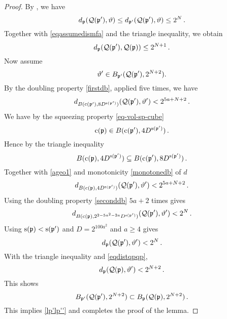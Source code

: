 \begin{proof}
\leanok
By , we have
\begin{equation}
     d_{{\mathfrak p}}({\mathcal{Q}}({\mathfrak p}'),{\vartheta})
     \le d_{{\mathfrak p}'}({\mathcal{Q}}({\mathfrak p}'),{\vartheta})
     \le 2^{N} \, .
\end{equation}
Together with \eqref{eqassumedismfa} and the triangle inequality, we obtain
\begin{equation}\label{eqdistqpqp}
    d_{{\mathfrak p}}({\mathcal{Q}}({\mathfrak p}'),{\mathcal{Q}}({\mathfrak p}))\le 2^{N+1} \, .
\end{equation}
Now assume
\begin{equation}
    {\vartheta}'\in B_{{\mathfrak p}'}({\mathcal{Q}}({\mathfrak p}'),2^{N+2}).
\end{equation}
By the doubling property \eqref{firstdb}, applied five times, we have
\begin{equation}\label{ageo1} d_{B({\mathrm{c}}({\mathfrak p}'),8D^{{\mathrm{s}}({\mathfrak p}')})}({\mathcal{Q}}({\mathfrak p}'),{\vartheta}') < 2^{5a+N+2}\, .
\end{equation}
We have by the squeezing property \eqref{eq-vol-sp-cube}
\begin{equation}
 {\mathrm{c}}({\mathfrak p})\in
B({\mathrm{c}}({\mathfrak p}'),4D^{{\mathrm{s}}({\mathfrak p}')})\, .
\end{equation}
Hence by the triangle inequality
\begin{equation}
 B({\mathrm{c}}({\mathfrak p}), 4D^{{\mathrm{s}}({\mathfrak p}')})
 \subseteq
B({\mathrm{c}}({\mathfrak p}'),8D^{{\mathrm{s}}({\mathfrak p}')})\, .
\end{equation}
Together with \eqref{ageo1} and monotonicity \eqref{monotonedb} of $d$
\begin{equation}
    d_{B({\mathrm{c}}({\mathfrak p}),4D^{{\mathrm{s}}({\mathfrak p}')})}({\mathcal{Q}}({\mathfrak p}'),{\vartheta}') < 2^{5a+N+2}\, .
\end{equation}
Using the doubling property \eqref{seconddb} $5a+2$ times gives
\begin{equation}
    d_{B({\mathrm{c}}({\mathfrak p}),2^{2-5a^2-2a}D^{{\mathrm{s}}({\mathfrak p}')})}({\mathcal{Q}}({\mathfrak p}'),{\vartheta}') < 2^{N}\, .
\end{equation}
Using ${\mathrm{s}}({\mathfrak p})<{\mathrm{s}}({\mathfrak p}')$ and $D=2^{100a^2}$ and $a\ge 4$ gives
\begin{equation}
    d_{{\mathfrak p}}({\mathcal{Q}}({\mathfrak p}'),{\vartheta}') < 2^{N}\, .
\end{equation}
With the triangle inequality and \eqref{eqdistqpqp},
\begin{equation}
    d_{{\mathfrak p}}({\mathcal{Q}}({\mathfrak p}),{\vartheta}') < 2^{N+2}\, .
\end{equation}
This shows
\begin{equation}
B_{{\mathfrak p}'}({\mathcal{Q}}({\mathfrak p}'),2^{N+2})\subset B_{{\mathfrak p}}({\mathcal{Q}}({\mathfrak p}),2^{N+2})\, .
\end{equation}
This implies \eqref{lp'lp''} and completes the proof of the lemma.
\end{proof}

